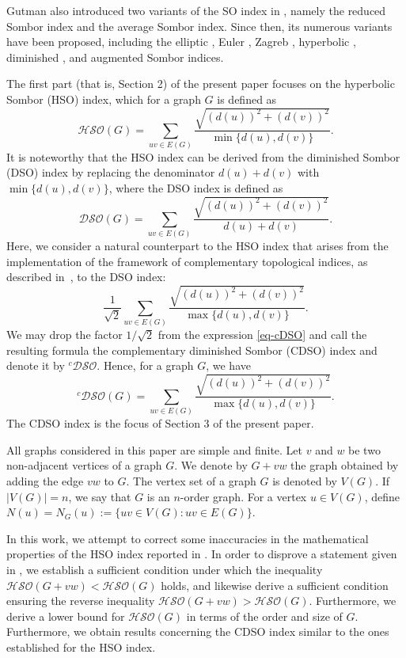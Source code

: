 \documentclass[12pt,a4paper]{article}
\begin{document}
Gutman also introduced two variants of the SO index in \cite{gutman21geo}, namely the reduced Sombor index and the average Sombor index. Since then, its numerous variants have been proposed, including the elliptic \cite{gutman24elliptic,gutman24eu}, Euler \cite{new7}, Zagreb \cite{Ali-AIMS-25,Ali-AIMS-2024}, hyperbolic \cite{Barman-MATCH-26}, diminished \cite{Movahedi-26}, and augmented \cite{ASO-index} Sombor indices.

The first part (that is, Section 2) of the present paper focuses on the hyperbolic Sombor (HSO) index, which for a graph $G$ is defined as
\[
\mathcal{HSO}(G) = \sum_{uv \in E(G)} \frac{\sqrt{(d(u))^2 + (d(v))^2}}{\min\{d(u), d(v)\}}.
\]
It is noteworthy that the HSO index can be derived from the diminished Sombor (DSO) index by replacing the denominator $d(u) + d(v)$ with $\min\{d(u), d(v)\}$, where the DSO index is defined as
\[
\mathcal{DSO}(G) = \sum_{uv \in E(G)} \frac{\sqrt{(d(u))^2 + (d(v))^2}}{d(u) + d(v)}.
\]
Here, we consider a natural counterpart to the HSO index that arises from the implementation of the framework of complementary topological indices, as described in~\cite{Furtula-MATCH-25}, to the DSO index:
\begin{equation}\label{eq-cDSO}
\frac{1}{\sqrt{2}} \sum_{uv \in E(G)} \frac{\sqrt{(d(u))^2 + (d(v))^2}}{\max\{d(u), d(v)\}}.
\end{equation}
We may drop the factor $1/\sqrt{2}$ from the expression \eqref{eq-cDSO} and call the resulting formula the complementary diminished Sombor (CDSO) index and denote it by $^c\mathcal{DSO}$. Hence, for a graph $G$, we have
\[
^c\mathcal{DSO}(G)=\sum_{uv\in E(G)} \frac{\sqrt{(d(u))^2+(d(v))^2}}{\max\{d(u),d(v)\}}.
\]
The CDSO index is the focus of Section 3 of the present paper.


All graphs considered in this paper are simple and finite. Let $v$ and $w$ be two non-adjacent vertices of a graph $G$. We denote by $G + vw$ the graph obtained by adding the edge $vw$ to $G$.  The vertex set of a graph $G$ is denoted by $V(G)$. If $|V(G)|=n$, we say that $G$ is an $n$-order graph. For a vertex $u \in V(G)$, define  $N(u)=N_G(u) := \{uv \in V(G) : uv \in E(G)\}$.

In this work, we attempt to correct some inaccuracies in the mathematical properties of the HSO index reported in \cite{Barman-MATCH-26}. In order to disprove a statement given in \cite{Barman-MATCH-26}, we establish a sufficient condition under which the inequality $\mathcal{HSO}(G + vw) < \mathcal{HSO}(G)$ holds, and likewise derive a sufficient condition ensuring the reverse inequality $\mathcal{HSO}(G + vw) > \mathcal{HSO}(G)$. Furthermore, we derive a lower bound for $\mathcal{HSO}(G)$ in terms of the order and size of $G$. Furthermore, we obtain results concerning the CDSO index similar to the ones established for the HSO index.
\end{document}
